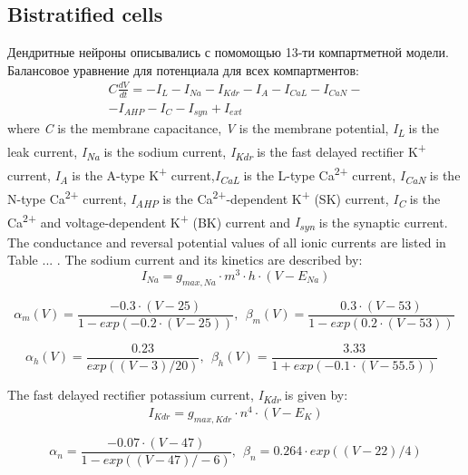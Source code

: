 \documentclass[a4paper,12pt]{article}
\begin{document}
\subsection{Bistratified cells}
Дендритные нейроны описывались с помомощью 13-ти компартметной модели. Балансовое уравнение для потенциала для всех компартментов:
\begin{eqnarray}
C\frac{dV}{dt}=-I_L-I_{Na}-I_{Kdr}-I_A-I_{CaL}-I_{CaN} - \nonumber \\ -I_{AHP}-I_C-I_{syn}+I_{ext}
\end{eqnarray}
where \textit{C} is the membrane capacitance, \textit{V} is the membrane potential, \textit{I\textsubscript{L}}
is the leak current, \textit{I\textsubscript{Na}} is the sodium current, \textit{I\textsubscript{Kdr}} is the fast delayed rectifier K\textsuperscript{+} current, \textit{I}\textit{\textsubscript{A}} is the A-type K\textsuperscript{+} current,\textit{I\textsubscript{CaL}}
is the L-type Ca\textsuperscript{2+} current, \textit{I}\textit{\textsubscript{CaN}} is the N-type
Ca\textsuperscript{2+} current, \textit{I}\textit{\textsubscript{AHP}} is the Ca\textsuperscript{2+}-dependent
K\textsuperscript{+} (SK) current, \textit{I}\textit{\textsubscript{C}} is the Ca\textsuperscript{2+} and
voltage-dependent K\textsuperscript{+} (BK) current and \textit{I}\textit{\textsubscript{syn}} is the synaptic current.
The conductance and reversal potential values of all ionic currents are listed in Table ... .
The sodium current and its kinetics are described by:
\begin{equation}
I_{Na}=g_{max, Na} \cdot m^3 \cdot h \cdot (V-E_{Na})
\end{equation}

\begin{equation}
\alpha_m(V)=\frac{-0.3\cdot(V-25)}{1-exp(-0.2\cdot(V-25))}, \ \  \beta_m(V)=\frac{0.3\cdot(V-53)}{1-exp(0.2\cdot(V-53))} \ 
\end{equation}

\begin{equation}
\alpha_h(V)=\frac{0.23}{exp((V-3)/20)}, \ \  \beta_h(V)=\frac{3.33}{1+exp(-0.1\cdot(V-55.5))}\ \ \ 
\end{equation}

The fast delayed rectifier potassium current, \textit{I\textsubscript{Kdr}} is given by:
\begin{equation}
I_{Kdr} = g_{max, Kdr} \cdot n^4 \cdot (V-E_K)
\end{equation}

\begin{equation}
\alpha_{n}=\frac{-0.07\cdot(V-47)}{1-exp((V-47)/-6)}, \ \  \beta_{n}=0.264\cdot exp((V-22)/4)
\end{equation}
\end{document}
